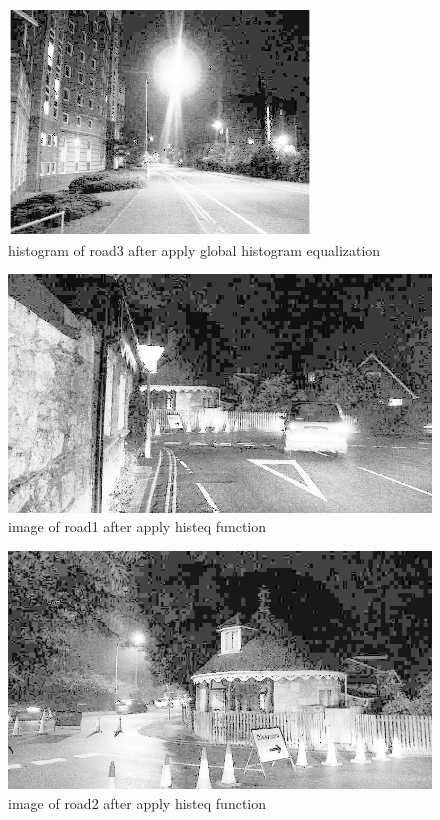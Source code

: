 \documentclass[
	12pt, %
]{fphw}
\begin{document}
\begin{figure}[H]
 
	\centering
	\includegraphics[width=1\columnwidth]{T2/result/hist3_myglobal.png} 
	\caption{histogram of road3 after apply global histogram equalization}
	\label{fig15}
\end{figure}
\begin{figure}[H]
 
	\centering
	\includegraphics[width=1\columnwidth]{T2/result/I1_global.jpg} 
	\caption{image of road1 after apply histeq function}
	\label{fig16}
\end{figure}
\begin{figure}[H]
 
	\centering
	\includegraphics[width=1\columnwidth]{T2/result/I2_global.jpg} 
	\caption{image of road2 after apply histeq function}
	\label{fig17}
\end{figure}
\end{document}
